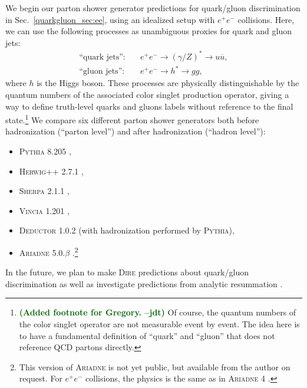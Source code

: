 \documentclass[11pt]{cernrep}
\newcommand{\jdt}[1]{\textbf{\textcolor{darkgreen}{(#1 --jdt)}}}
\begin{document}
We begin our parton shower generator predictions for quark/gluon discrimination in Sec.~\ref{quarkgluon_sec:ee}, using an idealized setup with $e^+e^-$ collisions.  Here, we can use the following processes as unambiguous proxies for quark and gluon jets:
\begin{align}
\text{``quark jets''}: \quad & e^+e^- \to (\gamma/Z)^* \to u \overline{u}, \\
\text{``gluon jets''}: \quad & e^+e^- \to h^* \to g g,
\end{align}
where $h$ is the Higgs boson.  These processes are physically
distinguishable by the quantum numbers of the associated color singlet
production operator, giving a way to define truth-level quarks and
gluons labels without reference to the final state.\footnote{\jdt{Added footnote for Gregory.}  Of course, the quantum numbers of the color singlet operator are not measurable event by event.  The idea here is to have a fundamental definition of ``quark'' and ``gluon'' that does not reference QCD partons directly.}  We
compare six different parton shower generators both before
hadronization (``parton level'') and after hadronization (``hadron
level''):
\begin{itemize}
\item \textsc{Pythia 8.205} \cite{Sjostrand:2014zea},
\item \textsc{Herwig++ 2.7.1} \cite{Bellm:2013hwb},
\item \textsc{Sherpa 2.1.1} \cite{Gleisberg:2008ta},
\item \textsc{Vincia 1.201} \cite{Giele:2013ema},
\item \textsc{Deductor 1.0.2} \cite{Nagy:2014mqa} (with hadronization performed by \textsc{Pythia}),
\item \textsc{Ariadne 5.0.$\beta$} \cite{Flensburg:2011kk}.\footnote{This version of \textsc{Ariadne} is not yet public, but available from the author on request.  For $e^+ e^-$ collisions, the physics is the same as in \textsc{Ariadne 4} \cite{Lonnblad:1992tz}.}
\end{itemize}
In the future, we plan to make \textsc{Dire} \cite{Hoche:2015sya} predictions about quark/gluon discrimination as well as investigate predictions from analytic resummation \cite{Larkoski:2013eya,Larkoski:2014pca}.
\end{document}
